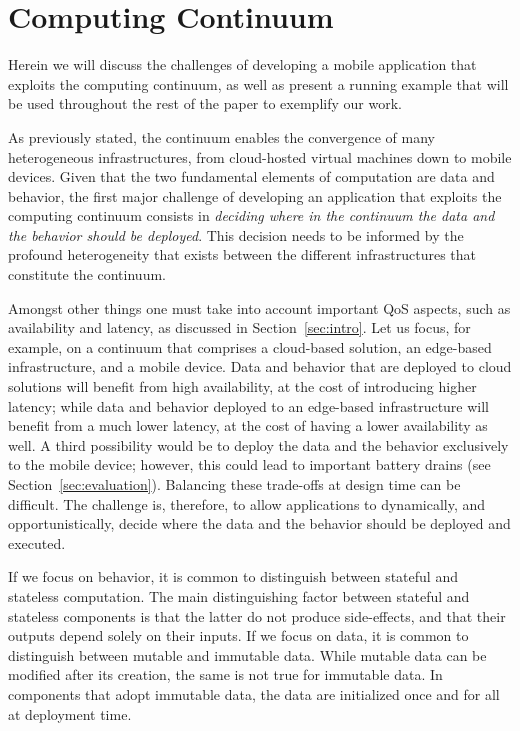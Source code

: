 \section{Computing Continuum}
\label{sec:example}

Herein we will discuss the challenges of developing a mobile application that exploits the computing continuum, as well as present a running example that will be used throughout the rest of the paper to exemplify our work.

As previously stated, the continuum enables the convergence of many heterogeneous infrastructures, from cloud-hosted virtual machines down to mobile devices. Given that the two fundamental elements of computation are data and behavior, the first major challenge of developing an application that exploits the computing continuum consists in \emph{deciding where in the continuum the data and the behavior should be deployed}. This decision needs to be informed by the profound heterogeneity that exists between the different infrastructures that constitute the continuum. 

Amongst other things one must take into account important QoS aspects, such as availability and latency, as discussed in Section~\ref{sec:intro}. Let us focus, for example, on a continuum that comprises a cloud-based solution, an edge-based infrastructure, and a mobile device. Data and behavior that are deployed to cloud solutions will benefit from high availability, at the cost of introducing higher latency; while data and behavior deployed to an edge-based infrastructure will benefit from a much lower latency, at the cost of having a lower availability as well. A third possibility would be to deploy the data and the behavior exclusively to the mobile device; however, this could lead to important battery drains (see Section~\ref{sec:evaluation}). Balancing these trade-offs at design time can be difficult. The challenge is, therefore, to allow applications to dynamically, and opportunistically, decide where the data and the behavior should be deployed and executed. 

If we focus on behavior, it is common to distinguish between stateful and stateless computation. The main distinguishing factor between stateful and stateless components is that the latter do not produce side-effects, and that their outputs depend solely on their inputs. If we focus on data, it is common to distinguish between mutable and immutable data. While mutable data can be modified after its creation, the same is not true for immutable data. In components that adopt immutable data, the data are initialized once and for all at deployment time. 

